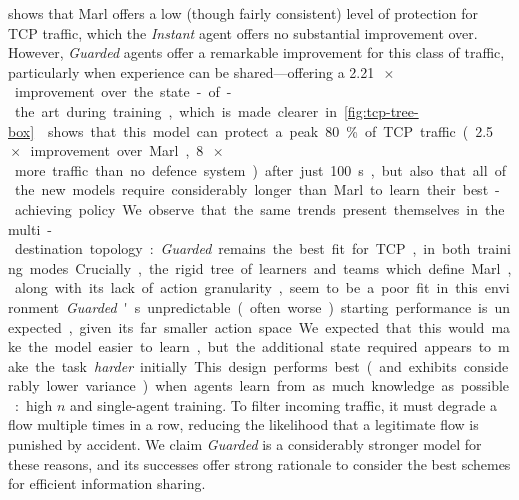 \documentclass[10pt, times, conference, letterpaper]{IEEEtran}
\begin{document}
%	

 shows that Marl offers a low (though fairly consistent) level of protection for TCP traffic, which the \emph{Instant} agent offers no substantial improvement over.
However, \emph{Guarded} agents offer a remarkable improvement for this class of traffic, particularly when experience can be shared---offering a \SI{2.21}{$\!\times$} improvement over the state-of-the art during training, which is made clearer in \cref{fig:tcp-tree-box}.
 shows that this model can protect a peak \SI{80}{\percent} of TCP traffic (\SI{2.5}{$\!\times$} improvement over Marl, \SI{8}{$\!\times$} more traffic than no defence system) after just \SI{100}{\second}, but also that all of the new models require considerably longer than Marl to learn their best-achieving policy.

We observe that the same trends present themselves in the multi-destination topology: \emph{Guarded} remains the best fit for TCP, in both training modes.
Crucially, the rigid tree of learners and teams which define Marl, along with its lack of action granularity, seem to be a poor fit in this environment.

\emph{Guarded}'s unpredictable (often worse) starting performance is unexpected, given its far smaller action space.
We expected that this would make the model easier to learn, but the additional state required appears to make the task \emph{harder} initially.
This design performs best (and exhibits considerably lower variance) when agents learn from as much knowledge as possible: high $n$ and single-agent training.
To filter incoming traffic, it must degrade a flow multiple times in a row, reducing the likelihood that a legitimate flow is punished by accident.
We claim \emph{Guarded} is a considerably stronger model for these reasons, and its successes offer strong rationale to consider the best schemes for efficient information sharing.

\end{document}
